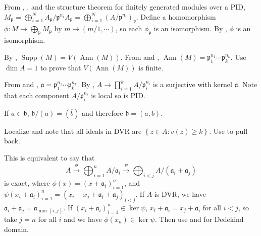 \begin{exercise}\label{ex9.6}
	From , , and the structure theorem for finitely generated modules over a PID, $M_\mathfrak{p}=\bigoplus_{i=1}^NA_\mathfrak{p}/\mathfrak{p}^{n_i}A_\mathfrak{p}=\bigoplus_{i=1}^N\left(A/\mathfrak{p}^{n_i}\right)_\mathfrak{p}$. Define a homomorphism $\phi:M\rightarrow\bigoplus_\mathfrak{p}M_\mathfrak{p}$ by $m\mapsto(m/1,\cdots)$, so each $\phi_\mathfrak{p}$ is an isomorphism. By , $\phi$ is an isomorphism.
	
	By , $\operatorname{Supp}(M)=V(\operatorname{Ann}(M))$. From  and , $\operatorname{Ann}(M)=\mathfrak{p}_1^{n_1}\cdots\mathfrak{p}_k^{n_k}$. Use $\dim A=1$ to prove that $V(\operatorname{Ann}(M))$ is finite.
\end{exercise}

\begin{exercise}\label{ex9.7}
	From  and , $\mathfrak{a}=\mathfrak{p}_1^{n_1}\cdots\mathfrak{p}_k^{n_k}$. By , $A\rightarrow\prod_{i=1}^{k}A/\mathfrak{p}_i^{n_i}$ is a surjective with kernel $\mathfrak{a}$. Note that each component $A/\mathfrak{p}_i^{n_i}$ is local so is PID.
	
	If $a\in\mathfrak{b}$, $\mathfrak{b}/(a)=(\overline{b})$ and therefore $\mathfrak{b}=(a,b)$.
\end{exercise}

\begin{exercise}\label{ex9.8}
	Localize and note that all ideals in DVR are $\left\{z\in A:v(z)\geqslant k\right\}$. Use  to pull back.
\end{exercise}

\begin{exercise}\label{ex9.9}
	This is equivalent to say that
	\begin{equation*}
		A\xrightarrow{\phi}\bigoplus_{i=1}^nA/\mathfrak{a}_i\xrightarrow{\psi}\bigoplus_{i<j}A/\left(\mathfrak{a}_i+\mathfrak{a}_j\right)
	\end{equation*}
	is exact, where $\phi(x)=\left(x+\mathfrak{a}_i\right)_{i=1}^n$, and $\psi\left(x_i+\mathfrak{a}_i\right)_{i=1}^n=\left(x_i-x_j+\mathfrak{a}_i+\mathfrak{a}_j\right)_{i<j}$. If $A$ is DVR, we have $\mathfrak{a}_i+\mathfrak{a}_j=\mathfrak{a}_{\min(i,j)}$. If $\left(x_i+\mathfrak{a}_i\right)_{i=1}^n\in\ker\psi$, $x_i+\mathfrak{a}_i=x_j+\mathfrak{a}_i$ for all $i<j$, so take $j=n$ for all $i$ and we have $\phi\left(x_n\right)\in\ker\psi$. Then use  and  for Dedekind domain.
\end{exercise}